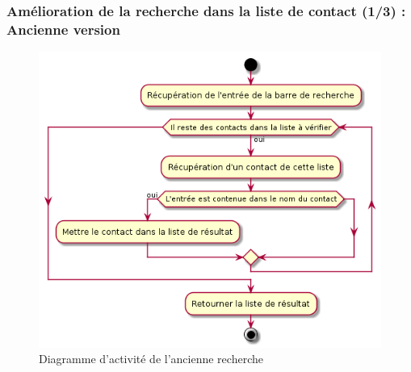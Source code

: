 \begin{frame}
	\frametitle{Amélioration de la recherche dans la liste de contact (1/3) : Ancienne version}

    \begin{center}
	  \begin{figure}
        \includegraphics[scale=0.30]{images/activity_retrieve_old.png}
	   \caption{Diagramme d'activité de l'ancienne recherche}
	  \end{figure}
	\end{center}

\end{frame}

